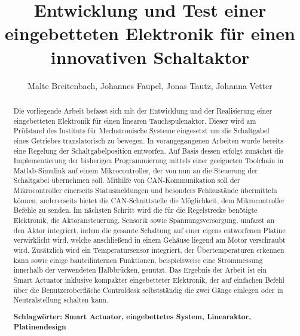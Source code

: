 \documentclass[nochapterpage,bigchapter,linedtoc,longdoc,colorback,accentcolor=tud1c]{tudreport}
\title{Entwicklung und Test einer eingebetteten Elektronik für einen innovativen Schaltaktor}
\subtitle{Malte Breitenbach, Johannes Faupel, Jonas Tautz, Johanna Vetter}
\begin{document}
\maketitle
\begin{abstract}

Die vorliegende Arbeit befasst sich mit der Entwicklung und der Realisierung  einer eingebetteten Elektronik für einen linearen Tauchspulenaktor.  Dieser wird am Prüfstand des Instituts für Mechatronische Systeme eingesetzt um die Schaltgabel eines Getriebes translatorisch zu bewegen.
In vorangegangenen Arbeiten wurde bereits eine Regelung der Schaltgabelposition entworfen. Auf Basis dessen erfolgt zunächst die Implementierung der bisherigen Programmierung mittels einer geeigneten Toolchain in Matlab-Simulink auf einem Mikrocontroller, der von nun an die Steuerung der Schaltgabel übernehmen soll. Mithilfe von CAN-Kommunikation soll der Mikrocontroller einerseits Statusmeldungen und besonders Fehlzustände übermitteln können, andererseits bietet die CAN-Schnittstelle die Möglichkeit, dem Mikrocontroller Befehle zu senden. Im nächsten Schritt wird die für die Regelstrecke benötigte Elektronik, die Aktoransteuerung, Sensorik sowie Spannungsversorgung, umfasst an den Aktor integriert, indem die gesamte Schaltung auf einer eigens entworfenen Platine verwirklicht wird, welche anschließend in einem Gehäuse liegend am Motor verschraubt wird. Zusätzlich wird ein Temperatursensor integriert, der Übertemperaturen erkennen kann sowie einige bauteilinternen Funktionen, beispielsweise eine Strommessung innerhalb der verwendeten Halbbrücken, genutzt.  Das Ergebnis der Arbeit ist ein Smart Actuator inklusive kompakter eingebetteter Elektronik, der auf einfachen Befehl über die Benutzeroberfläche Controldesk selbstständig die zwei Gänge einlegen oder in Neutralstellung schalten kann.

\textbf{Schlagwörter: Smart Actuator, eingebettetes System, Linearaktor, Platinendesign}



\end{abstract}
\end{document}
